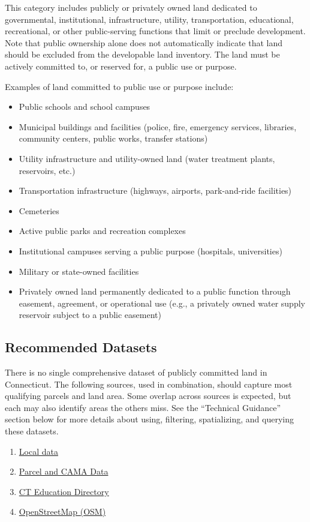 \documentclass[
  letterpaper,
  DIV=11,
  numbers=noendperiod]{scrreprt}
\providecommand{\tightlist}{%
  \setlength{\itemsep}{0pt}\setlength{\parskip}{0pt}}
\begin{document}
This category includes publicly or privately owned land dedicated to
governmental, institutional, infrastructure, utility, transportation,
educational, recreational, or other public-serving functions that limit
or preclude development. Note that public ownership alone does not
automatically indicate that land should be excluded from the developable
land inventory. The land must be actively committed to, or reserved for,
a public use or purpose.

Examples of land committed to public use or purpose include:

\begin{itemize}
\tightlist
\item
  Public schools and school campuses
\item
  Municipal buildings and facilities (police, fire, emergency services,
  libraries, community centers, public works, transfer stations)
\item
  Utility infrastructure and utility-owned land (water treatment plants,
  reservoirs, etc.)
\item
  Transportation infrastructure (highways, airports, park-and-ride
  facilities)
\item
  Cemeteries
\item
  Active public parks and recreation complexes
\item
  Institutional campuses serving a public purpose (hospitals,
  universities)
\item
  Military or state-owned facilities
\item
  Privately owned land permanently dedicated to a public function
  through easement, agreement, or operational use (e.g., a privately
  owned water supply reservoir subject to a public easement)
\end{itemize}

\subsection{Recommended Datasets}\label{recommended-datasets}

There is no single comprehensive dataset of publicly committed land in
Connecticut. The following sources, used in combination, should capture
most qualifying parcels and land area. Some overlap across sources is
expected, but each may also identify areas the others miss. See the
``Technical Guidance'' section below for more details about using,
filtering, spatializing, and querying these datasets.

\begin{enumerate}
\def\labelenumi{\arabic{enumi}.}
\tightlist
\item
  \hyperref[sec-local-data]{Local data}
\item
  \hyperref[sec-parcel-and-cama-data]{Parcel and CAMA Data}
\item
  \hyperref[sec-ct-education-directory]{CT Education Directory}
\item
  \hyperref[sec-openstreetmap]{OpenStreetMap (OSM)}
\end{enumerate}
\end{document}
